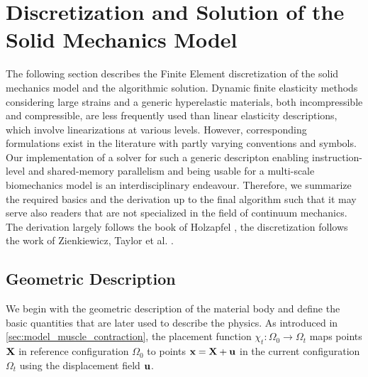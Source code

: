 

\section{Discretization and Solution of the Solid Mechanics Model}\label{sec:discretization_mechanics}

The following section describes the Finite Element discretization of the solid mechanics model and the algorithmic solution. Dynamic finite elasticity methods considering large strains and a generic hyperelastic materials, both incompressible and compressible, are less frequently used than linear elasticity descriptions, which involve linearizations at various levels. However, corresponding formulations exist in the literature with partly varying conventions and symbols. Our implementation of a solver for such a generic descripton enabling instruction-level and shared-memory parallelism and being usable for a multi-scale biomechanics model is an interdisciplinary endeavour. Therefore, we summarize the required basics and the derivation up to the final algorithm such that it may serve also readers that are not specialized in the field of continuum mechanics. The derivation largely follows the book of Holzapfel \cite{holzapfel2000nonlinear}, the discretization follows the work of Zienkiewicz, Taylor et al. \cite{zienkiewicz1977finite,zienkiewicz2005finite}.

\subsection{Geometric Description}\label{sec:geometric_description}


We begin with the geometric description of the material body and define the basic quantities that are later used to describe the physics.
As introduced in \cref{sec:model_muscle_contraction}, the placement function $\chi_t:\Omega_0\to \Omega_t$ maps points $\textbf{X}$ in reference configuration $\Omega_0$ to points $\textbf{x} = \textbf{X} + \textbf{u}$ in the current configuration $\Omega_t$ using the displacement field $\textbf{u}$.

